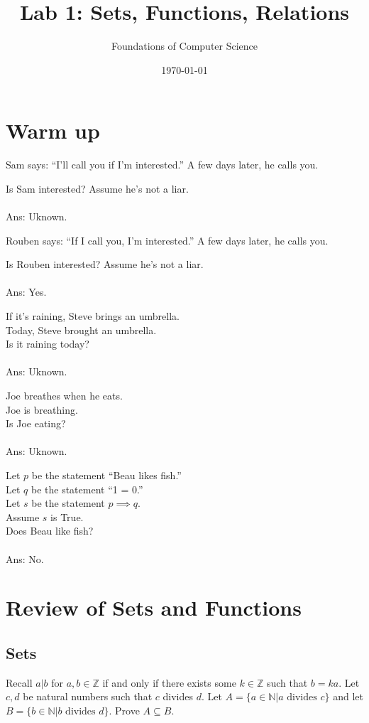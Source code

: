 \documentclass[]{exam}
\title{Lab 1: Sets, Functions, Relations}
\author{Foundations of Computer Science}
\date{\today}
\theoremstyle{definition}
\newcommand{\bb}[1]{\mathbb{#1}}
\newcommand{\Z}{\bb{Z}}
\newcommand{\N}{\bb{N}}
\begin{document}
\maketitle

\begin{questions}

\section*{Warm up}
\question
Sam says: ``I'll call you if I'm interested.'' A few days later, he calls you.

Is Sam interested? Assume he's not a liar.
\\~\\
Ans: Uknown.


\question
Rouben says: ``If I call you, I'm interested.'' A few days later, he calls you.

Is Rouben interested? Assume he's not a liar.
\\~\\
Ans: Yes.

\question If it's raining, Steve brings an umbrella.\\
    Today, Steve brought an umbrella.\\
    Is it raining today?
\\~\\
Ans: Uknown.


\question Joe breathes when he eats.\\
    Joe is breathing.\\
    Is Joe eating?
\\~\\
Ans: Uknown.


\question Let $p$ be the statement ``Beau likes fish.''\\
    Let $q$ be the statement ``1 = 0.''\\
    Let $s$ be the statement $p \implies q$.\\
    Assume $s$ is True.\\
    Does Beau like fish?
\\~\\
Ans: No.


\section*{Review of Sets and Functions}
\subsection*{Sets}
Recall $a|b$ for $a,b \in \Z$ if and only if there exists some $k \in \Z$ such that $b = ka$.
\question Let $c, d$ be natural numbers such that $c$ divides $d$.
   Let $A = \{a \in \N| a \text{ divides } c \}$ and let\\ 
   $B = \{b \in \N| b\text{ divides }d \}$. Prove $A \subseteq B$.


\end{questions}
\end{document}
